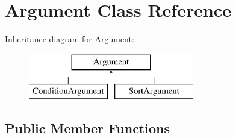 \hypertarget{classArgument}{}\section{Argument Class Reference}
\label{classArgument}
Inheritance diagram for Argument\+:\begin{figure}[H]
\begin{center}
\leavevmode
\includegraphics[height=2.000000cm]{classArgument}
\end{center}
\end{figure}
\subsection*{Public Member Functions}
